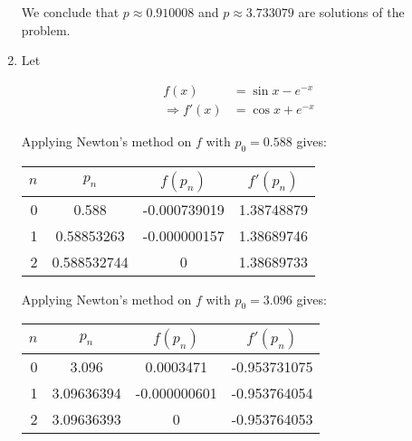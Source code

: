 \documentclass[../../../../Assignments]{subfiles}
\begin{document}
\begin{solution}
\begin{enumerate}[label = \alph*)]
            We conclude that \(p \approx \num{0.910008}\) and \(p \approx
            \num{3.733079}\) are solutions of the problem.

        \item Let

            \begin{align*}
                             f(x) &= \sin{x} - e^{-x} \\
                \Rightarrow f'(x) &= \cos{x} + e^{-x}
            \end{align*}

            Applying Newton's method on \(f\) with \(p_0 = \num{0.588}\) gives:

            \begin{table}[H]
                \centering
                \begin{tabular}{r S[table-format=1.9] S[table-format=-1.9] S[table-format=1.8]}
                    \toprule
                    \(n\)  &   {\(p_n\)}   &  {\(f(p_n)\)}  &  {\(f'(p_n)\)}  \\
                      &  0.588        &  -0.000739019  &  1.38748879     \\
                        1  &  0.58853263   &  -0.000000157  &  1.38689746     \\
                        2  &  0.588532744  &   0            &  1.38689733     \\
                    \bottomrule
                \end{tabular}
            \end{table}

            Applying Newton's method on \(f\) with \(p_0 = \num{3.096}\) gives:

            \begin{table}[H]
                \centering
                \begin{tabular}{r S[table-format=1.8] S[table-format=-1.9] S[table-format=-1.9]}
                    \toprule
                    \(n\)  &   {\(p_n\)}   &  {\(f(p_n)\)}  &  {\(f'(p_n)\)}  \\
                      &  3.096        &   0.0003471    &  -0.953731075   \\
                        1  &  3.09636394   &  -0.000000601  &  -0.953764054   \\
                        2  &  3.09636393   &   0            &  -0.953764053   \\
                    \bottomrule
                \end{tabular}
            \end{table}


\end{enumerate}
\end{solution}
\end{document}
